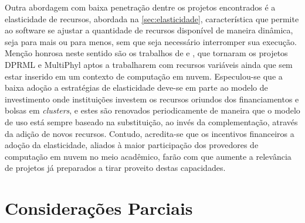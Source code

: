 \documentclass[english,brazilian]{UNISINOSmonografia} %
\begin{document}


Outra abordagem com baixa penetração dentre os projetos encontrados é a elasticidade de recursos, abordada na \autoref{sec:elasticidade}, característica que permite ao software se ajustar a quantidade de recursos disponível de maneira dinâmica, seja para mais ou para menos, sem que seja necessário interromper sua execução.
Menção honrosa neste sentido são os trabalhos de  e , que tornaram os projetos DPRML e MultiPhyl aptos a trabalharem com recursos variáveis ainda que sem estar inserido em um contexto de computação em nuvem.
Especulou-se que a baixa adoção a estratégias de elasticidade deve-se em parte ao modelo de investimento onde instituições investem os recursos oriundos dos financiamentos e bolsas em \textit{clusters}, e estes são renovados periodicamente de maneira que o modelo de uso está sempre baseado na substituição, ao invés da complementação, através da adição de novos recursos.
Contudo, acredita-se que os incentivos financeiros a adoção da elasticidade, aliados à maior participação dos provedores de computação em nuvem no meio acadêmico, farão com que aumente a relevância de projetos já preparados a tirar proveito destas capacidades.






\section{Considerações Parciais}
\end{document}
